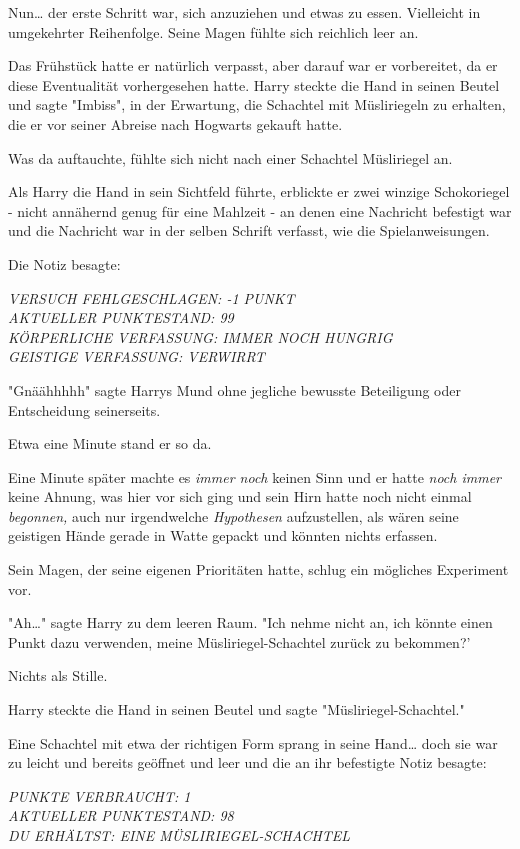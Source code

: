 {Nun… der erste Schritt war, sich anzuziehen und etwas zu essen. Vielleicht in umgekehrter Reihenfolge. Seine Magen fühlte sich reichlich leer an.

Das Frühstück hatte er natürlich verpasst, aber darauf war er vorbereitet, da er diese Eventualität vorhergesehen hatte. Harry steckte die Hand in seinen Beutel und sagte "Imbiss", in der Erwartung, die Schachtel mit Müsliriegeln zu erhalten, die er vor seiner Abreise nach Hogwarts gekauft hatte.

Was da auftauchte, fühlte sich nicht nach einer Schachtel Müsliriegel an.

Als Harry die Hand in sein Sichtfeld führte, erblickte er zwei winzige Schokoriegel - nicht annähernd genug für eine Mahlzeit - an denen eine Nachricht befestigt war und die Nachricht war in der selben Schrift verfasst, wie die Spielanweisungen.

Die Notiz besagte:

\emph{VERSUCH FEHLGESCHLAGEN: -1 PUNKT\\ AKTUELLER PUNKTESTAND: 99\\ KÖRPERLICHE VERFASSUNG: IMMER NOCH HUNGRIG\\ GEISTIGE VERFASSUNG: VERWIRRT}

"Gnäähhhhh" sagte Harrys Mund ohne jegliche bewusste Beteiligung oder Entscheidung seinerseits.

Etwa eine Minute stand er so da.

Eine Minute später machte es \emph{immer noch} keinen Sinn und er hatte \emph{noch immer} keine Ahnung, was hier vor sich ging und sein Hirn hatte noch nicht einmal \emph{begonnen,} auch nur irgendwelche \emph{Hypothesen} aufzustellen, als wären seine geistigen Hände gerade in Watte gepackt und könnten nichts erfassen.

Sein Magen, der seine eigenen Prioritäten hatte, schlug ein mögliches Experiment vor.

"Ah…" sagte Harry zu dem leeren Raum. "Ich nehme nicht an, ich könnte einen Punkt dazu verwenden, meine Müsliriegel-Schachtel zurück zu bekommen?'

Nichts als Stille.

Harry steckte die Hand in seinen Beutel und sagte "Müsliriegel-Schachtel."

Eine Schachtel mit etwa der richtigen Form sprang in seine Hand… doch sie war zu leicht und bereits geöffnet und leer und die an ihr befestigte Notiz besagte:

\emph{PUNKTE VERBRAUCHT: 1\\ AKTUELLER PUNKTESTAND: 98\\ DU ERHÄLTST: EINE MÜSLIRIEGEL-SCHACHTEL}

}
